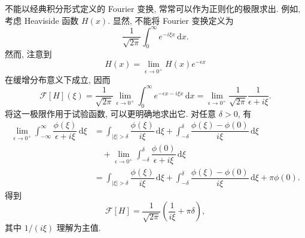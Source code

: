 \begin{Example}
\label{ex:fourier-heaviside-regularization}
不能以经典积分形式定义的 Fourier 变换, 常常可以作为正则化的极限求出. 例如, 考虑 Heaviside 函数 $H(x)$. 显然, 不能将 Fourier 变换定义为
\begin{equation}\label{eq:heaviside-nonconvergent-fourier-integral}
\dfrac1{\sqrt{2\pi}}\int_0^\infty e^{-i\xi x}\,\mathrm{d}x.
\end{equation}
然而, 注意到
\begin{equation}\label{eq:heaviside-exponential-regularization}
H(x)=\lim_{\epsilon\to0^+}H(x)e^{-\epsilon x}
\end{equation}
在缓增分布意义下成立, 因而
\begin{equation}\label{eq:heaviside-fourier-regularized-limit}
\mathcal{F}[H](\xi)=\dfrac1{\sqrt{2\pi}}\lim_{\epsilon\to0^+}\int_0^\infty e^{-\epsilon x-i\xi x}\,\mathrm{d}x=\lim_{\epsilon\to0^+}\dfrac1{\sqrt{2\pi}}\dfrac1{\epsilon+i\xi}.
\end{equation}
将这一极限作用于试验函数, 可以更明确地求出它. 对任意 $\delta>0$, 有
\begin{equation}\label{eq:heaviside-fourier-principal-value-limit}
\begin{aligned}
\lim_{\epsilon\to0^+}\int_{-\infty}^\infty\dfrac{\phi(\xi)}{\epsilon+i\xi}\,\mathrm{d}\xi
&=\int_{|\xi|>\delta}\dfrac{\phi(\xi)}{i\xi}\,\mathrm{d}\xi
+\int_{-\delta}^{\delta}\dfrac{\phi(\xi)-\phi(0)}{i\xi}\,\mathrm{d}\xi\\
&\quad+\lim_{\epsilon\to0^+}\int_{-\delta}^{\delta}\dfrac{\phi(0)}{\epsilon+i\xi}\,\mathrm{d}\xi\\
&=\int_{|\xi|>\delta}\dfrac{\phi(\xi)}{i\xi}\,\mathrm{d}\xi
+\int_{-\delta}^{\delta}\dfrac{\phi(\xi)-\phi(0)}{i\xi}\,\mathrm{d}\xi+\pi\phi(0).
\end{aligned}
\end{equation}
得到
\begin{equation}\label{eq:heaviside-fourier-principal-value-formula}
\mathcal{F}[H]=\dfrac1{\sqrt{2\pi}}\left(\dfrac1{i\xi}+\pi\delta\right),
\end{equation}
其中 $1/(i\xi)$ 理解为主值.
\end{Example}

